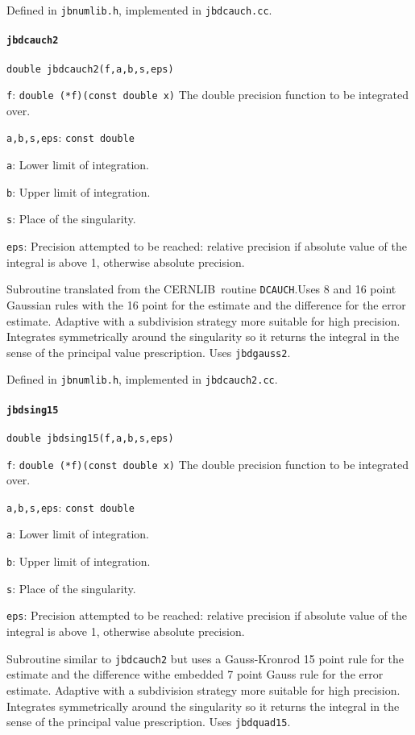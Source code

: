 \documentclass[12pt,a4paper]{article}
\newcommand{\mytt}[1]{\texttt{#1}}
\newcommand{\newfunction}[1]{\mytt{#1}\index{\mytt{#1}}}
\newcommand{\cernlib}{\textsc{CERNLIB}\cite{cernlib}}
\begin{document}
Defined in \mytt{jbnumlib.h}, implemented in \mytt{jbdcauch.cc}.

\paragraph{\newfunction{jbdcauch2}}

\mytt{double jbdcauch2(f,a,b,s,eps)}

\mytt{f}: \mytt{double (*f)(const double x)} The double precision
function to be integrated over.

\mytt{a,b,s,eps}: \mytt{const double}

\mytt{a}: Lower limit of integration.

\mytt{b}: Upper limit of integration.

\mytt{s}: Place of the singularity.

\mytt{eps}: Precision attempted to be reached: relative precision if absolute
value of the integral is above 1, otherwise absolute precision.

Subroutine translated from the \cernlib\ routine \mytt{DCAUCH}.Uses
8 and 16 point Gaussian rules with the 16 point for the estimate
and the difference for the error estimate. Adaptive with a subdivision strategy
more suitable for high precision.
Integrates symmetrically around
the singularity so it returns the integral in the sense of the
principal value prescription. Uses \mytt{jbdgauss2}.

Defined in \mytt{jbnumlib.h}, implemented in \mytt{jbdcauch2.cc}.

\paragraph{\newfunction{jbdsing15}}

\mytt{double jbdsing15(f,a,b,s,eps)}

\mytt{f}: \mytt{double (*f)(const double x)} The double precision
function to be integrated over.

\mytt{a,b,s,eps}: \mytt{const double}

\mytt{a}: Lower limit of integration.

\mytt{b}: Upper limit of integration.

\mytt{s}: Place of the singularity.

\mytt{eps}: Precision attempted to be reached: relative precision if absolute
value of the integral is above 1, otherwise absolute precision.

Subroutine similar to \mytt{jbdcauch2}
but uses a Gauss-Kronrod 15 point rule for the estimate
and the difference withe embedded 7 point Gauss rule for the error estimate.
Adaptive with a subdivision strategy
more suitable for high precision.
Integrates symmetrically around
the singularity so it returns the integral in the sense of the
principal value prescription. Uses \mytt{jbdquad15}.
\end{document}
